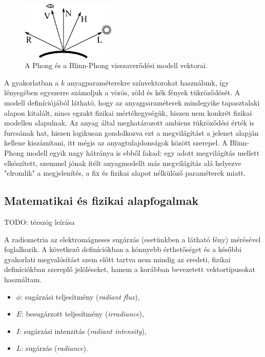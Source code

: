 \begin{figure}[!ht]
    \centering
    \includegraphics[width=0.4\textwidth]{images/blinn_vectors.eps}
    \caption{A Phong és a Blinn-Phong visszaverődési modell vektorai.}
\end{figure}

A gyakorlatban a \(k\) anyagparaméterekre színvektorokat használunk, így lényegében egyszerre számoljuk a vörös, zöld és kék fények tükröződését. A modell definíciójából látható, hogy az anyagparaméterek mindegyike tapasztalaki alapon kitalált, nincs egzakt fizikai mértékegységük, hiszen nem konkrét fizikai modellen alapulnak. Az anyag által meghatározott ambiens tükröződési érték is furcsának hat, hiszen logikusan gondolkozva ezt a megvilágítást a jelenet alapján kellene kiszámítani, itt mégis az anyagtulajdonságok között szerepel. A Blinn-Phong modell egyik nagy hátránya is ebből fakad: egy adott megvilágítás mellett elkészített, szemmel jónak ítélt anyagmodellt más megvilágítás alá helyezve "elromlik" a megjelenítés, a fix és fizikai alapot nélkülöző paraméterek miatt.

\subsection{Matematikai és fizikai alapfogalmak}
\label{subsec:matbase}

TODO: térszög leírása

A radiometria az elektromágneses sugárzás (esetünkben a látható fény) mérésével foglalkozik. A következő definíciókban a könnyebb érthetőséget és a későbbi gyakorlati megvalósítást szem előtt tartva nem mindig az eredeti, fizikai definíciókban szereplő jelöléseket, hanem a korábban bevezetett vektortípusokat használtam.

\begin{itemize}[noitemsep]
\item \(\phi\): sugárzási teljesítmény (\textit{radiant flux}),
\item \(E\): besugárzott teljesítmény (\textit{irradiance}),
\item \(I\): sugárzási intenzitás (\textit{radiant intensity}),
\item \(L\): sugárzás (\textit{radiance}).
\end{itemize}

